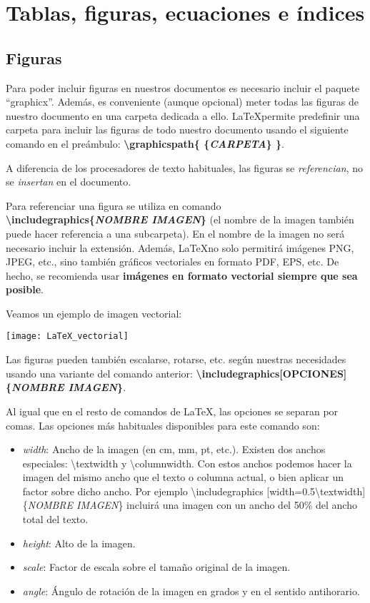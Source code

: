 \chapter{Tablas, figuras, ecuaciones e índices}

\section{Figuras}

Para poder incluir figuras en nuestros documentos es necesario incluir el paquete ``graphicx''. Además, es conveniente (aunque opcional) meter todas las figuras de nuestro documento en una carpeta dedicada a ello. \LaTeX permite predefinir una carpeta para incluir las figuras de todo nuestro documento usando el siguiente comando en el preámbulo: \textbf{\textbackslash graphicspath\{ \{\emph{CARPETA}\} \}}.

A diferencia de los procesadores de texto habituales, las figuras se \emph{referencian}, no se \emph{insertan} en el documento.

Para referenciar una figura se utiliza en comando \textbf{\textbackslash  includegraphics\{\emph{NOMBRE IMAGEN}\}} (el nombre de la imagen también puede hacer referencia a una subcarpeta). En el nombre de la imagen no será necesario incluir la extensión. Además, \LaTeX no solo permitirá imágenes PNG, JPEG, etc., sino también gráficos vectoriales en formato PDF, EPS, etc. De hecho, se recomienda usar \textbf{imágenes en formato vectorial siempre que sea posible}.

Veamos un ejemplo de imagen vectorial:

\texttt{[image: LaTeX\_vectorial]}

Las figuras pueden también escalarse, rotarse, etc. según nuestras necesidades usando una variante del comando anterior: \textbf{\textbackslash includegraphics[OPCIONES] \{\emph{NOMBRE IMAGEN}\}}. 

Al igual que en el resto de comandos de \LaTeX, las opciones se separan por comas. Las opciones más habituales disponibles para este comando son:

\begin{itemize}
	\item \emph{width}: Ancho de la imagen (en cm, mm, pt, etc.). Existen dos anchos especiales: \textbackslash textwidth y \textbackslash columnwidth. Con estos anchos podemos hacer la imagen del mismo ancho que el texto o columna actual, o bien aplicar un factor sobre dicho ancho. Por ejemplo \textbackslash includegraphics [width=0.5\textbackslash textwidth]\{\emph{NOMBRE IMAGEN}\} incluirá una imagen con un ancho del 50\% del ancho total del texto.
	\item \emph{height}: Alto de la imagen.
	\item \emph{scale}: Factor de escala sobre el tamaño original de la imagen.
	\item \emph{angle}: Ángulo de rotación de la imagen en grados y en el sentido antihorario.
\end{itemize}

